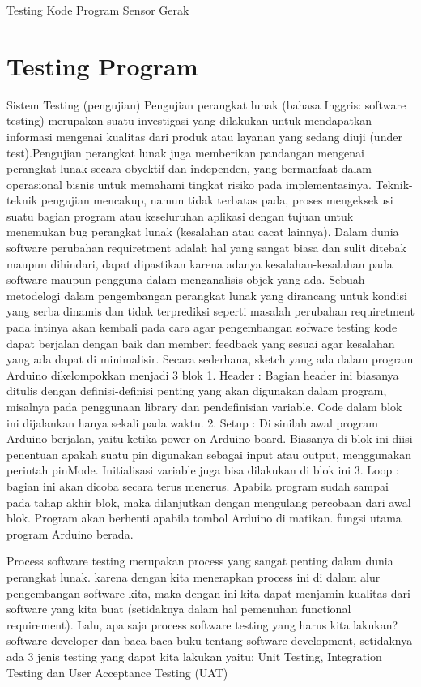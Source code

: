 
Testing Kode Program Sensor Gerak

\section {Testing Program}
Sistem Testing (pengujian)
Pengujian perangkat lunak (bahasa Inggris: software testing) merupakan suatu investigasi yang dilakukan untuk mendapatkan informasi mengenai kualitas dari produk atau layanan yang sedang diuji (under test).Pengujian perangkat lunak juga memberikan pandangan mengenai perangkat lunak secara obyektif dan independen, yang bermanfaat dalam operasional bisnis untuk memahami tingkat risiko pada implementasinya. Teknik-teknik pengujian mencakup, namun tidak terbatas pada, proses mengeksekusi suatu bagian program atau keseluruhan aplikasi dengan tujuan untuk menemukan bug perangkat lunak (kesalahan atau cacat lainnya).
Dalam dunia software perubahan requiretment adalah hal yang sangat biasa dan sulit ditebak maupun dihindari, dapat dipastikan karena adanya kesalahan-kesalahan pada software maupun pengguna dalam menganalisis objek yang ada. Sebuah metodelogi dalam pengembangan perangkat lunak yang dirancang untuk kondisi yang serba dinamis dan tidak terprediksi seperti masalah perubahan requiretment pada intinya akan kembali pada cara agar pengembangan sofware testing kode dapat berjalan dengan baik dan memberi feedback yang sesuai agar kesalahan yang ada dapat di minimalisir.
Secara sederhana, sketch yang ada dalam program Arduino dikelompokkan menjadi 3 blok 
1.	Header	: Bagian header ini biasanya ditulis dengan definisi-definisi penting yang akan digunakan dalam program, misalnya pada penggunaan library dan pendefinisian variable. Code dalam blok ini dijalankan hanya sekali pada waktu.
2.	Setup	: Di sinilah awal program Arduino berjalan, yaitu ketika power on Arduino board. Biasanya di blok ini diisi penentuan apakah suatu pin digunakan sebagai input atau output, menggunakan perintah pinMode. Initialisasi variable juga bisa dilakukan di blok ini
3.	Loop	: bagian ini akan dicoba secara terus menerus. Apabila program sudah sampai pada tahap akhir blok, maka dilanjutkan dengan mengulang percobaan dari awal blok. Program akan berhenti apabila tombol Arduino di matikan. fungsi utama program Arduino berada.

Process software testing merupakan process yang sangat penting dalam dunia perangkat lunak. karena dengan kita menerapkan process ini di dalam alur pengembangan software kita, maka dengan ini kita dapat menjamin kualitas dari software yang kita buat (setidaknya dalam hal pemenuhan functional requirement). Lalu, apa saja process software testing yang harus kita lakukan? software developer dan baca-baca buku tentang software development, setidaknya ada 3 jenis testing yang dapat kita lakukan yaitu: Unit Testing, Integration Testing dan User Acceptance Testing (UAT)

